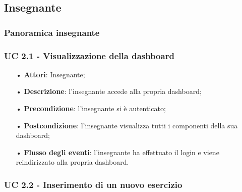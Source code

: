\subsection{Insegnante}

\subsubsection{Panoramica insegnante}

\subsubsection{UC 2.1 - Visualizzazione della dashboard}
\begin{itemize}
	\item[•] \textbf{Attori}: Insegnante;
	\item[•] \textbf{Descrizione}: l’insegnante accede alla propria dashboard;
	\item[•] \textbf{Precondizione}: l'insegnante si è autenticato;
	\item[•] \textbf{Postcondizione}: l'insegnante visualizza tutti i componenti della sua dashboard;
	\item[•] \textbf{Flusso degli eventi}: l’insegnante ha effettuato il login e viene reindirizzato alla propria dashboard.
\end{itemize}

\subsubsection{UC 2.2 - Inserimento di un nuovo esercizio}

